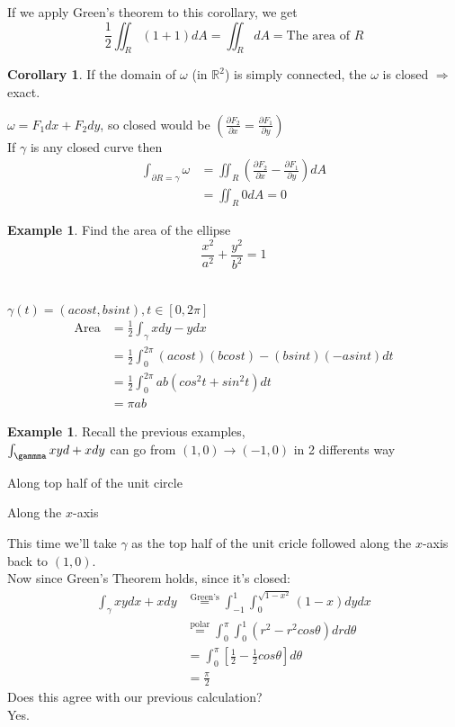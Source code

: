 \documentclass[12pt]{article}
\theoremstyle{plain}
\theoremstyle{definition}
\newtheorem{example}[theorem]{Example}
\newtheorem{corollary}[theorem]{Corollary}
\begin{document}
	If we apply Green's theorem to this corollary, we get
	$$\frac{1}{2} \iint_R (1+1) dA = \iint_R dA = \text{The area of $R$}$$

	\begin{corollary}
		If the domain of $\omega$ (in $\mathbb{R}^2$) is simply connected, the $\omega$ is closed $\Longrightarrow$ exact.
	\end{corollary}

	$\omega = F_1 dx + F_2 dy$, so closed would be $(\frac{\partial F_2}{\partial x} = \frac{\partial F_1}{\partial y})$\\
	If $\gamma$ is any closed curve then
	\begin{align*}
		\int_{\partial R = \gamma} \omega &= \iint_R (\frac{\partial F_2}{\partial x} - \frac{\partial F_1}{\partial y}) dA\\
		&= \iint_R 0 dA = 0
	\end{align*}

	\begin{example}
		Find the area of the ellipse
		$$\frac{x^2}{a^2} + \frac{y^2}{b^2} = 1$$\\
		\\
		$\gamma (t) = (acost, bsint), t\in [0,2\pi]$
		\begin{align*}
			\text{Area} &= \frac{1}{2} \int_\gamma xdy-ydx\\
			&= \frac{1}{2} \int^{2\pi}_0 (acost)(bcost)-(bsint)(-asint)dt\\
			&= \frac{1}{2} \int^{2\pi}_0 ab (cos^2 t + sin^2 t)dt\\
			&= \pi ab
		\end{align*}
	\end{example}

	\begin{example}
		Recall the previous examples,\\
		$\int_\gammma xyd + xdy$ can go from $(1,0)\to (-1,0)$ in 2 differents way\\
		\begin{enu}
			\item{Along top half of the unit circle}
			\item{Along the $x$-axis}
		\end{enu}
		This time we'll take $\gamma$ as the top half of the unit cricle followed along the $x$-axis back to $(1,0)$.\\
		Now since Green's Theorem holds, since it's closed:
		\begin{align*}
			\int_\gamma xydx + xdy &\overset{\text{Green's}}{=} \int^1_{-1} \int_0^{\sqrt{1-x^2}} (1-x) dydx\\
			&\overset{\text{polar}}{=} \int^\pi_0 \int^1_0 (r^2 - r^2 cos\theta) dr d\theta\\
			&= \int^\pi_0 [\frac{1}{2} - \frac{1}{2} cos\theta]d\theta\\
			&= \frac{\pi}{2}
		\end{align*}
		Does this agree with our previous calculation?\\
		Yes.
	\end{example}
\end{document}
